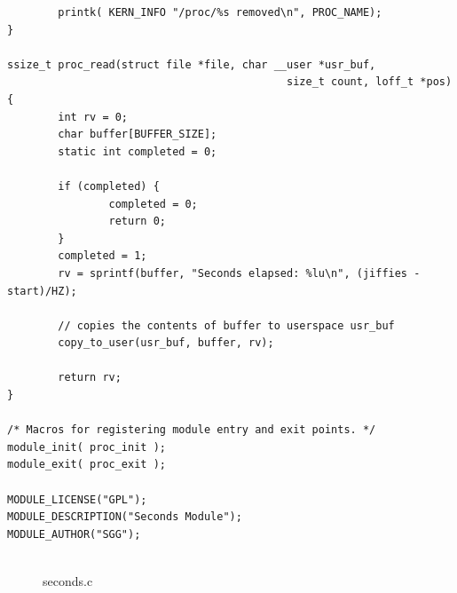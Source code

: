 \documentclass{article}
\begin{document}
\begin{shaded}
\begin{lstlisting}
        printk( KERN_INFO "/proc/%s removed\n", PROC_NAME);
}

ssize_t proc_read(struct file *file, char __user *usr_buf, 
                                            size_t count, loff_t *pos)
{
        int rv = 0;
        char buffer[BUFFER_SIZE];
        static int completed = 0;

        if (completed) {
                completed = 0;
                return 0;
        }
        completed = 1;
        rv = sprintf(buffer, "Seconds elapsed: %lu\n", (jiffies - start)/HZ);

        // copies the contents of buffer to userspace usr_buf
        copy_to_user(usr_buf, buffer, rv);

        return rv;
}

/* Macros for registering module entry and exit points. */
module_init( proc_init );
module_exit( proc_exit );

MODULE_LICENSE("GPL");
MODULE_DESCRIPTION("Seconds Module");
MODULE_AUTHOR("SGG");


    \end{lstlisting}
\end{shaded}
\begin{figure}[h]
    \caption{seconds.c}
\end{figure}
\pagebreak
\end{document}
